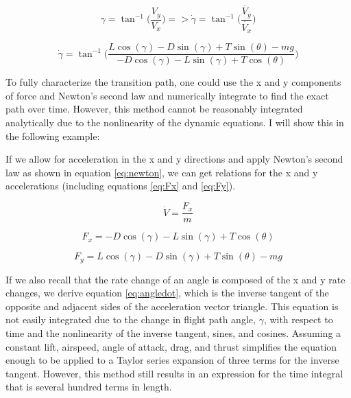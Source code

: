 \documentclass[10pt,english]{article}
\begin{document}
        \begin{equation}
\label{eq:angledot1}
\gamma = \tan^{-1} \Bigg(\frac{V_y}{V_x} \Bigg) => \dot{\gamma} = \tan^{-1} \Bigg(\frac{\dot{V_y}}{\dot{V_x}} \Bigg)
\end{equation}

        
        \begin{equation}
\label{eq:angledot}
\dot{\gamma} = \tan^{-1} \Bigg(\frac{L \cos(\gamma) - D \sin(\gamma) + T \sin(\theta)- m g}{-D \cos(\gamma) - L \sin(\gamma) + T \cos(\theta)}\Bigg)
\end{equation}

To fully characterize the transition path, one could use the x and y components of force and Newton's second law and numerically integrate to find the exact path over time.  However, this method cannot be reasonably integrated analytically due to the nonlinearity of the dynamic equations.  I will show this in the following example:

If we allow for acceleration in the x and y directions and apply Newton's second law as shown in equation \ref{eq:newton}, we can get relations for the x and y accelerations (including equations \ref{eq:Fx} and \ref{eq:Fy}).

\begin{equation}
\label{eq:newton}
\dot{V} = \frac{F_x}{m}
\end{equation}

\begin{equation}
\label{eq:Fx}
F_x = -D \cos(\gamma) - L \sin(\gamma) + T \cos(\theta)
\end{equation}

\begin{equation}
\label{eq:Fy}
F_y = L \cos(\gamma) - D \sin(\gamma) + T \sin(\theta) - m g
\end{equation}

\vspace{10pt}
\noindent If we also recall that the rate change of an angle is composed of the x and y rate changes, we derive equation \ref{eq:angledot}, which is the inverse tangent of the opposite and adjacent sides of the acceleration vector triangle.  This equation is not easily integrated due to the change in flight path angle, $\gamma$, with respect to time and the nonlinearity of the inverse tangent, sines, and cosines.  Assuming a constant lift, airspeed, angle of attack, drag, and thrust simplifies the equation enough to be applied to a Taylor series expansion of three terms for the inverse tangent.  However, this method still results in an expression for the time integral that is several hundred terms in length.
\end{document}
